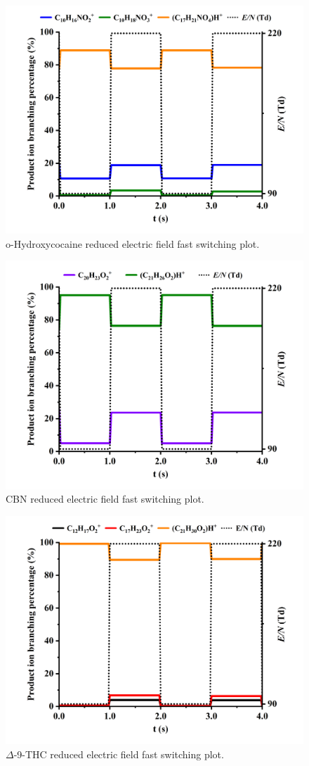 \begin{figure}[htb]
\centering
\includegraphics[width=0.50\linewidth]{pics/other_drugs/ohcocaine-fs-90-220.png}
\caption{o-Hydroxycocaine reduced electric field fast switching plot.}
\label{fig:DR_ohcocaine_fs}
\end{figure}



\begin{figure}[htb]
\centering
\includegraphics[width=0.50\linewidth]{pics/other_drugs/CBN-fs-90-220.png}
\caption{CBN reduced electric field fast switching plot.}
\label{fig:DR_CBN_fs}
\end{figure}



\begin{figure}[htb]
\centering
\includegraphics[width=0.50\linewidth]{pics/other_drugs/THC-fs-90-220.png}
\caption{$\Delta$-9-THC reduced electric field fast switching plot.}
\label{fig:DR_THC_fs}
\end{figure}



